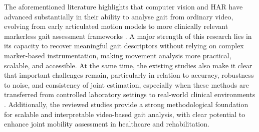 \documentclass[12pt]{elsarticle}
\begin{document}
The aforementioned literature highlights that computer vision and HAR have advanced substantially in their ability to analyse gait from ordinary video, evolving from early articulated motion models to more clinically relevant markerless gait assessment frameworks \cite{ju1996cardboard,prakash2018vision,lv2022analysis,cotton2022transforming}. A major strength of this research lies in its capacity to recover meaningful gait descriptors without relying on complex marker-based instrumentation, making movement analysis more practical, scalable, and accessible. At the same time, the existing studies also make it clear that important challenges remain, particularly in relation to accuracy, robustness to noise, and consistency of joint estimation, especially when these methods are transferred from controlled laboratory settings to real-world clinical environments \cite{ong2017efficacy,juri2020characterization,armstrong2022novel,stenum2024clinical}. Additionally, the reviewed studies provide a strong methodological foundation for scalable and interpretable video-based gait analysis, with clear potential to enhance joint mobility assessment in healthcare and rehabilitation.
\end{document}

